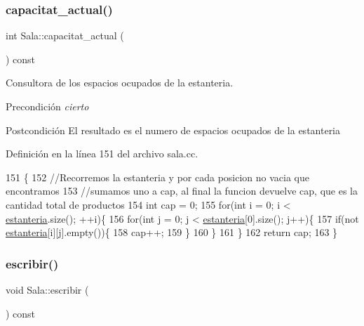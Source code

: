 \subsubsection{\texorpdfstring{capacitat\+\_\+actual()}{capacitat\_actual()}}
{\footnotesize\ttfamily int Sala\+::capacitat\+\_\+actual (\begin{DoxyParamCaption}{ }\end{DoxyParamCaption}) const}



Consultora de los espacios ocupados de la estanteria. 

\begin{DoxyPrecond}{Precondición}
{\itshape cierto} 
\end{DoxyPrecond}
\begin{DoxyPostcond}{Postcondición}
El resultado es el numero de espacios ocupados de la estanteria 
\end{DoxyPostcond}


Definición en la línea 151 del archivo sala.\+cc.


\begin{DoxyCode}
151                                 \{
152     \textcolor{comment}{//Recorremos la estanteria y por cada posicion no vacia que encontramos}
153     \textcolor{comment}{//sumamos uno a cap, al final la funcion devuelve cap, que es la cantidad total de productos}
154     \textcolor{keywordtype}{int} cap = 0;
155     \textcolor{keywordflow}{for}(\textcolor{keywordtype}{int} i = 0; i < \mbox{\hyperlink{class_sala_a8f5264818c98db9c0d075c51a7672d95}{estanteria}}.size(); ++i)\{
156         \textcolor{keywordflow}{for}(\textcolor{keywordtype}{int} j = 0; j < \mbox{\hyperlink{class_sala_a8f5264818c98db9c0d075c51a7672d95}{estanteria}}[0].size(); j++)\{
157             \textcolor{keywordflow}{if}(not \mbox{\hyperlink{class_sala_a8f5264818c98db9c0d075c51a7672d95}{estanteria}}[i][j].empty())\{
158                 cap++;
159             \}
160         \}
161     \}
162     \textcolor{keywordflow}{return} cap;
163 \}
\end{DoxyCode}
\mbox{\label{class_sala_a972a0cf004635c588343ddad949282e0}} 
\subsubsection{\texorpdfstring{escribir()}{escribir()}}
{\footnotesize\ttfamily void Sala\+::escribir (\begin{DoxyParamCaption}{ }\end{DoxyParamCaption}) const}



